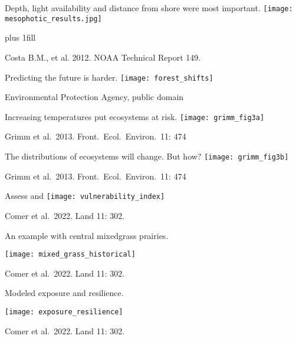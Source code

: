 \documentclass[t]{beamer}
\begin{document}
\begin{frame}[t,plain]{Depth, light availability and distance from shore were most important.}
	\centering%
		\texttt{[image: mesophotic\_results.jpg]}\par

	\vskip0pt plus 1fill

\hfill\tiny Costa B.M., et al. 2012. NOAA Technical Report 149.
\end{frame}

\begin{frame}{Predicting the future is harder.}
\texttt{[image: forest\_shifts]}

\tinyfill Environmental Protection Agency, public domain
\end{frame}

\begin{frame}{Increasing temperatures put ecosystems at risk.}
\texttt{[image: grimm\_fig3a]}

\tinyfill Grimm et al.\ 2013. Front.\ Ecol.\ Environ.\ 11: 474
\end{frame}

\begin{frame}{The distributions of ecosystems will change. But how?}
\texttt{[image: grimm\_fig3b]}

\tinyfill Grimm et al.\ 2013. Front.\ Ecol.\ Environ.\ 11: 474
\end{frame}

\begin{frame}{Assess  and }
\centering
\texttt{[image: vulnerability\_index]}

\tinyfill Comer et al.\ 2022. Land 11: 302.
\end{frame}

\begin{frame}{An example with central mixedgrass prairies.}

\texttt{[image: mixed\_grass\_historical]}

\tinyfill Comer et al.\ 2022. Land 11: 302.
\end{frame}

\begin{frame}{Modeled exposure and resilience.}

\texttt{[image: exposure\_resilience]}

\tinyfill Comer et al.\ 2022. Land 11: 302.
\end{frame}
\end{document}
